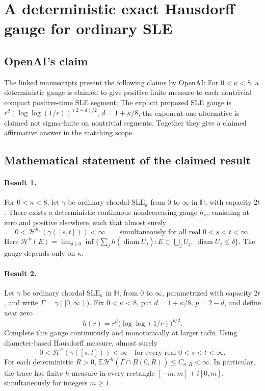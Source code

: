\documentclass[11pt]{article}
\begin{document}
\section*{A deterministic exact Hausdorff gauge for ordinary SLE}

\subsection{OpenAI's claim}
The linked manuscripts present the following claims by OpenAI: For $0<\kappa<8$, a deterministic gauge is claimed to give positive finite measure to each nontrivial compact positive-time SLE segment; The explicit proposed SLE gauge is $r^d(\log\log(1/r))^{(2-d)/2}$, $d=1+\kappa/8$; the exponent-one alternative is claimed not sigma-finite on nontrivial segments. Together they give a claimed affirmative answer in the matching scope.

\subsection{Mathematical statement of the claimed result}
\paragraph{Result 1.} For $0<\kappa<8$, let $\gamma$ be ordinary chordal $\mathrm{SLE}_\kappa$ from $0$ to $\infty$ in $\mathbb H$, with capacity $2t$. There exists a deterministic continuous nondecreasing gauge $h_\kappa$, vanishing at zero and positive elsewhere, such that almost surely
\[
 0<\mathcal H^{h_\kappa}(\gamma([s,t]))<\infty
 \qquad\text{simultaneously for all real }0<s<t<\infty.
\]
Here $\mathcal H^h(E)=\lim_{\delta\downarrow0}\inf\{\sum_jh(\operatorname{diam}U_j):E\subset\bigcup_jU_j,\ \operatorname{diam}U_j\le\delta\}$. The gauge depends only on $\kappa$.

\paragraph{Result 2.} Let $\gamma$ be ordinary chordal $\mathrm{SLE}_\kappa$ in $\mathbb H$, from $0$ to $\infty$, parametrized with capacity $2t$, and write $\Gamma=\gamma([0,\infty))$. Fix $0<\kappa<8$, put $d=1+\kappa/8$, $p=2-d$, and define near zero
\[
 h(r)=r^d\bigl(\log\log(1/r)\bigr)^{p/2}.
\]
Complete this gauge continuously and monotonically at larger radii. Using diameter-based Hausdorff measure, almost surely
\[
 0<\mathcal H^h(\gamma([s,t]))<\infty\quad\text{for every real }0<s<t<\infty.
\]
For each deterministic $R>0$, $\mathbb E\mathcal H^h(\Gamma\cap\overline B(0,R))\le C_{\kappa,R}<\infty$. In particular, the trace has finite $h$-measure in every rectangle $[-m,m]+i[0,m]$, simultaneously for integers $m\ge1$.
\end{document}
